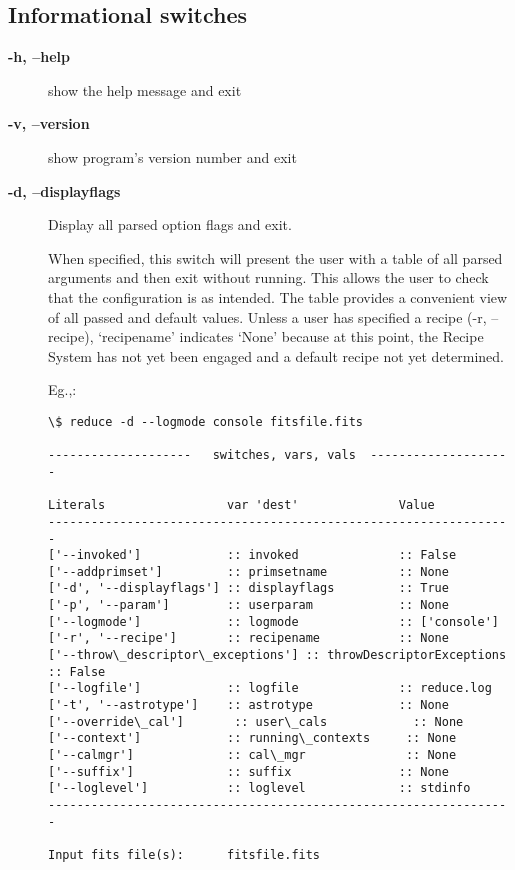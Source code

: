 \documentclass[letterpaper,10pt,english]{sphinxmanual}
\begin{document}
\subsection{Informational switches}
\label{interfaces:informational-switches}\begin{description}
\item[{\textbf{-h, --help}}] \leavevmode
show the help message and exit

\item[{\textbf{-v, --version}}] \leavevmode
show program's version number and exit

\item[{\textbf{-d, --displayflags}}] \leavevmode
Display all parsed option flags and exit.

When specified, this switch will present the user with a table of all
parsed arguments and then exit without running. This allows the user to
check that the configuration is as intended. The table provides a convenient
view of all passed and default values. Unless a user has specified a
recipe (-r, --recipe), `recipename' indicates `None' because at this point,
the Recipe System has not yet been engaged and a default recipe not yet
determined.

Eg.,:

\begin{Verbatim}[commandchars=\\\{\}]
\$ reduce -d --logmode console fitsfile.fits

--------------------   switches, vars, vals  --------------------

Literals                 var 'dest'              Value
-----------------------------------------------------------------
['--invoked']            :: invoked              :: False
['--addprimset']         :: primsetname          :: None
['-d', '--displayflags'] :: displayflags         :: True
['-p', '--param']        :: userparam            :: None
['--logmode']            :: logmode              :: ['console']
['-r', '--recipe']       :: recipename           :: None
['--throw\_descriptor\_exceptions'] :: throwDescriptorExceptions :: False
['--logfile']            :: logfile              :: reduce.log
['-t', '--astrotype']    :: astrotype            :: None
['--override\_cal']       :: user\_cals            :: None
['--context']            :: running\_contexts     :: None
['--calmgr']             :: cal\_mgr              :: None
['--suffix']             :: suffix               :: None
['--loglevel']           :: loglevel             :: stdinfo
-----------------------------------------------------------------

Input fits file(s):      fitsfile.fits
\end{Verbatim}

\end{description}
\end{document}
